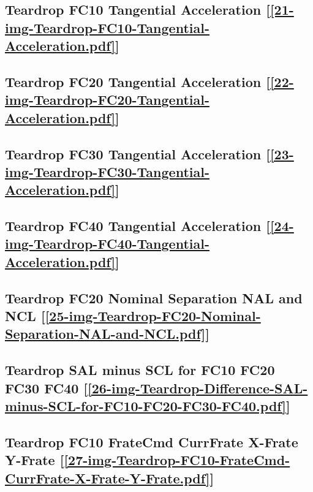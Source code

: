 \subsection       {Teardrop FC10 Tangential Acceleration
	[\ref      {21-img-Teardrop-FC10-Tangential-Acceleration.pdf}] }
\label{ssec-21-img-Teardrop-FC10-Tangential-Acceleration.pdf}

\subsection       {Teardrop FC20 Tangential Acceleration
	[\ref      {22-img-Teardrop-FC20-Tangential-Acceleration.pdf}] }
\label{ssec-22-img-Teardrop-FC20-Tangential-Acceleration.pdf}

\subsection       {Teardrop FC30 Tangential Acceleration
	[\ref      {23-img-Teardrop-FC30-Tangential-Acceleration.pdf}] }
\label{ssec-23-img-Teardrop-FC30-Tangential-Acceleration.pdf}

\subsection       {Teardrop FC40 Tangential Acceleration
	[\ref      {24-img-Teardrop-FC40-Tangential-Acceleration.pdf}] }
\label{ssec-24-img-Teardrop-FC40-Tangential-Acceleration.pdf}

\subsection       {Teardrop FC20 Nominal Separation NAL and NCL
	[\ref      {25-img-Teardrop-FC20-Nominal-Separation-NAL-and-NCL.pdf}] }
\label{ssec-25-img-Teardrop-FC20-Nominal-Separation-NAL-and-NCL.pdf}

\subsection       {Teardrop SAL minus SCL for FC10 FC20 FC30 FC40
	[\ref      {26-img-Teardrop-Difference-SAL-minus-SCL-for-FC10-FC20-FC30-FC40.pdf}] }
\label{ssec-26-img-Teardrop-Difference-SAL-minus-SCL-for-FC10-FC20-FC30-FC40.pdf}


\subsection       {Teardrop FC10 FrateCmd CurrFrate X-Frate Y-Frate
	[\ref      {27-img-Teardrop-FC10-FrateCmd-CurrFrate-X-Frate-Y-Frate.pdf}] }
\label{ssec-27-img-Teardrop-FC10-FrateCmd-CurrFrate-X-Frate-Y-Frate.pdf}

